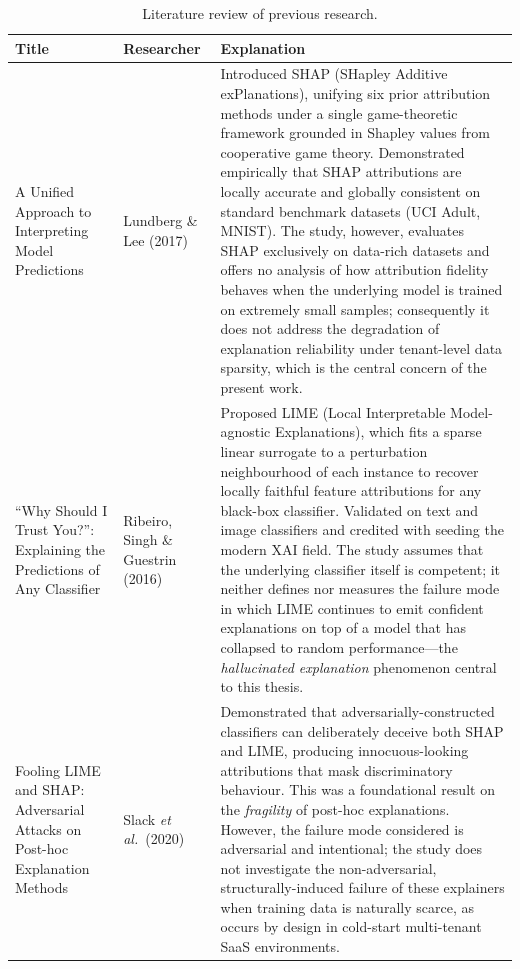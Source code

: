 \begin{table}[h]
\centering
\caption{Literature review of previous research.}
\label{tab:literature-review}
\renewcommand{\arraystretch}{1.25}
\begin{tabularx}{\textwidth}{@{}p{3.4cm} p{2.7cm} X@{}}
\toprule
\textbf{Title} & \textbf{Researcher} & \textbf{Explanation} \\
\midrule
A Unified Approach to Interpreting Model Predictions
& Lundberg \& Lee (2017)
& Introduced SHAP (SHapley Additive exPlanations), unifying six prior
attribution methods under a single game-theoretic framework grounded in Shapley
values from cooperative game theory. Demonstrated empirically that SHAP
attributions are locally accurate and globally consistent on standard benchmark
datasets (UCI Adult, MNIST). The study, however, evaluates SHAP exclusively on
data-rich datasets and offers no analysis of how attribution fidelity behaves
when the underlying model is trained on extremely small samples; consequently
it does not address the degradation of explanation reliability under
tenant-level data sparsity, which is the central concern of the present work. \\

``Why Should I Trust You?'': Explaining the Predictions of Any Classifier
& Ribeiro, Singh \& Guestrin (2016)
& Proposed LIME (Local Interpretable Model-agnostic Explanations), which fits a
sparse linear surrogate to a perturbation neighbourhood of each instance to
recover locally faithful feature attributions for any black-box classifier.
Validated on text and image classifiers and credited with seeding the modern
XAI field. The study assumes that the underlying classifier itself is
competent; it neither defines nor measures the failure mode in which LIME
continues to emit confident explanations on top of a model that has collapsed
to random performance---the \emph{hallucinated explanation} phenomenon central
to this thesis. \\

Fooling LIME and SHAP: Adversarial Attacks on Post-hoc Explanation Methods
& Slack \emph{et al.}\ (2020)
& Demonstrated that adversarially-constructed classifiers can deliberately
deceive both SHAP and LIME, producing innocuous-looking attributions that mask
discriminatory behaviour. This was a foundational result on the \emph{fragility}
of post-hoc explanations. However, the failure mode considered is adversarial
and intentional; the study does not investigate the non-adversarial,
structurally-induced failure of these explainers when training data is
naturally scarce, as occurs by design in cold-start multi-tenant SaaS
environments. \\


\end{tabularx}
\end{table}

